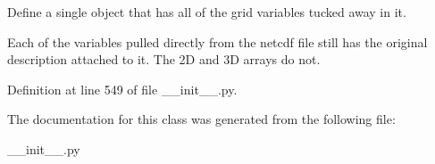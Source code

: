Define a single object that has all of the grid variables tucked away in it. 

Each of the variables pulled directly from the netcdf file still has the original description attached to it. The 2\+D and 3\+D arrays do not. 

Definition at line 549 of file \+\_\+\+\_\+init\+\_\+\+\_\+.\+py.



The documentation for this class was generated from the following file\+:\begin{DoxyCompactItemize}
\item 
\+\_\+\+\_\+init\+\_\+\+\_\+.\+py\end{DoxyCompactItemize}
